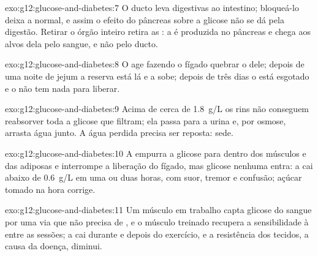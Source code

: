 \begin{solution}{exo:g12:glucose-and-diabetes:7}
O ducto leva  digestivas ao intestino; bloqueá-lo deixa a
 normal, e assim o efeito do pâncreas sobre a glicose não se dá
pela digestão. Retirar o órgão inteiro retira as : a  é
produzida no pâncreas e chega aos alvos dela pelo sangue, e não pelo ducto.
\end{solution}

\begin{solution}{exo:g12:glucose-and-diabetes:8}
O  age fazendo o fígado quebrar o  dele; depois de
uma noite de jejum a reserva está lá e a  sobe; depois de três
dias o  está esgotado e o  não tem nada para liberar.
\end{solution}

\begin{solution}{exo:g12:glucose-and-diabetes:9}
Acima de cerca de \qty{1.8}{g/L} os rins não conseguem reabsorver toda
a glicose que filtram; ela passa para a urina e, por osmose, arrasta
água junto. A água perdida precisa ser reposta: sede.
\end{solution}

\begin{solution}{exo:g12:glucose-and-diabetes:10}
A  empurra a glicose para dentro dos músculos e das 
adiposas e interrompe a liberação do fígado, mas glicose nenhuma entra:
a  cai abaixo de \qty{0.6}{g/L} em uma ou duas horas, com suor,
tremor e confusão; açúcar tomado na hora corrige.
\end{solution}

\begin{solution}{exo:g12:glucose-and-diabetes:11}
Um músculo em trabalho capta glicose do sangue por uma via que não
precisa de , e o músculo treinado recupera a sensibilidade à
 entre as sessões; a  cai durante e depois do
exercício, e a resistência dos tecidos, a causa da doença, diminui.
\end{solution}


